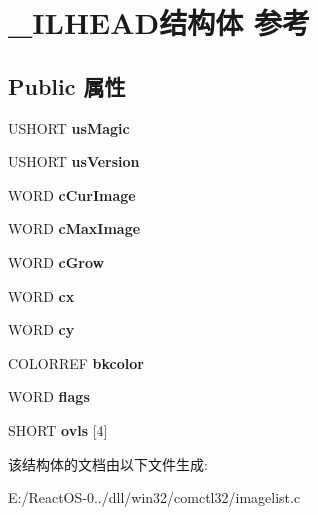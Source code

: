\hypertarget{struct___i_l_h_e_a_d}{}\section{\+\_\+\+I\+L\+H\+E\+A\+D结构体 参考}
\label{struct___i_l_h_e_a_d}
\subsection*{Public 属性}
\begin{DoxyCompactItemize}
\item 
\mbox{\label{struct___i_l_h_e_a_d_a9ea071fe4c9a45a2ccd4f7a87782c8a3}} 
U\+S\+H\+O\+RT {\bfseries us\+Magic}
\item 
\mbox{\label{struct___i_l_h_e_a_d_ae27da42f670543280c4a4e751f10c112}} 
U\+S\+H\+O\+RT {\bfseries us\+Version}
\item 
\mbox{\label{struct___i_l_h_e_a_d_a0d2e491daf67ed391a7075a0c74f3a14}} 
W\+O\+RD {\bfseries c\+Cur\+Image}
\item 
\mbox{\label{struct___i_l_h_e_a_d_a5cda9421c1016cca7389288c6d6ff6dd}} 
W\+O\+RD {\bfseries c\+Max\+Image}
\item 
\mbox{\label{struct___i_l_h_e_a_d_aa7cae0bf1bab04bc103425324e9d1644}} 
W\+O\+RD {\bfseries c\+Grow}
\item 
\mbox{\label{struct___i_l_h_e_a_d_ae5b8a15d4d6019955f2f34b48092d2eb}} 
W\+O\+RD {\bfseries cx}
\item 
\mbox{\label{struct___i_l_h_e_a_d_a406cb54b20768de944b5cf41cc7f97fa}} 
W\+O\+RD {\bfseries cy}
\item 
\mbox{\label{struct___i_l_h_e_a_d_ad99c9c30a808ce7de316a88c40b864f2}} 
C\+O\+L\+O\+R\+R\+EF {\bfseries bkcolor}
\item 
\mbox{\label{struct___i_l_h_e_a_d_a21c776ee1d53686667fc18ea8e8a2692}} 
W\+O\+RD {\bfseries flags}
\item 
\mbox{\label{struct___i_l_h_e_a_d_a15395e09b1d6382a8783937f0579fa00}} 
S\+H\+O\+RT {\bfseries ovls} \mbox{[}4\mbox{]}
\end{DoxyCompactItemize}


该结构体的文档由以下文件生成\+:\begin{DoxyCompactItemize}
\item 
E\+:/\+React\+O\+S-\/0../dll/win32/comctl32/imagelist.\+c\end{DoxyCompactItemize}
